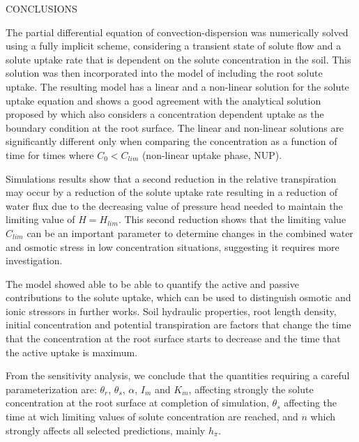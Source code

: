 \cleardoublepage
\chap CONCLUSIONS

The partial differential equation of convection-dispersion was numerically solved using a fully implicit scheme, considering a transient state of solute flow and a solute uptake rate that is dependent on the solute concentration in the soil.
This solution was then incorporated into the model of \citeonline[liersolute] including the root solute uptake.
The resulting model has a linear and a non-linear solution for the solute uptake equation and shows a good agreement with the analytical solution proposed by \citeonline[cushman] which also considers a concentration dependent uptake as the boundary condition at the root surface.
The linear and non-linear solutions are significantly different only when comparing the concentration as a function of time for times where $C_0 < C_{lim}$ (non-linear uptake phase, NUP).

Simulations results show that a second reduction in the relative transpiration may occur by a reduction of the solute uptake rate resulting in a reduction of water flux due to the decreasing value of pressure head needed to maintain the limiting value of $H=H_{lim}$.
This second reduction shows that the limiting value $C_{lim}$ can be an important parameter to determine changes in the combined water and osmotic stress in low concentration situations, suggesting it requires more investigation.

The model showed able to be able to quantify the active and passive contributions to the solute uptake, which can be used to distinguish osmotic and ionic stressors in further works.
Soil hydraulic properties, root length density, initial concentration and potential transpiration are factors that change the time that the concentration at the root surface starts to decrease and the time that the active uptake is maximum. 


From the sensitivity analysis, we conclude that the quantities requiring a careful parameterization are: $\theta_r$, $\theta_s$, $\alpha$, $I_m$ and $K_m$, affecting strongly the solute concentration at the root surface at completion of simulation, $\theta_s$ affecting the time at wich limiting values of solute concentration are reached, and $n$ which strongly affects all selected predictions, mainly $h_\pi$. 

